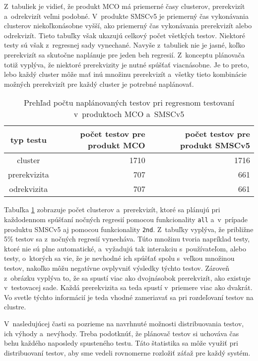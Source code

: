 Z~tabuliek je vidieť, že produkt MCO má priemerné časy clusterov, 
prerekvizít a~odrekvizít veľmi podobné. V~produkte SMSCv5 je priemerný 
čas vykonávania clusterov niekoľkonásobne vyšší, ako priemerný čas 
vykonávania prerekvizít alebo odrekvizít.
Tieto tabuľky však ukazujú celkový počet všetkých testov. 
Niektoré testy sú však z~regresnej sady vynechané.
Navyše z~tabuliek nie je jasné, koľko prerekvizít sa skutočne naplánuje 
pre jeden beh regresií. Z~konceptu plánovača totiž vyplýva, že niektoré 
prerekvizity je nutné spúšťať viacnásobne.
Je to preto, lebo každý cluster môže mať inú množinu prerekvizít
a~všetky tieto kombinácie možných prerekvizít pre každý cluster
je potrebné naplánovať.

\begin{table}
  \begin{center}
    \begin{tabular}{| c | r | r |}
    \hline
    typ testu    & počet testov pre produkt MCO & 
    počet testov pre produkt SMSCv5 \\ \hline
    cluster      & 1710 & 1716 \\ \hline
    prerekvizita & 707  & 661  \\ \hline
    odrekvizita  & 707  & 661 \\
    \hline
    \end{tabular}
    \caption{Prehľad počtu naplánovaných testov pri regresnom testovaní 
             v~produktoch MCO a~SMSCv5}
    \label{tabulka:pocet_naplanovanych_testov}
  \end{center}
\end{table}

Tabuľka \ref{tabulka:pocet_naplanovanych_testov} zobrazuje počet 
clusterov a~prerekvizít, ktoré sa plánujú pri každodennom spúšťaní 
nočných regresií pomocou funkcionality \texttt{all} a~v~prípade produktu 
SMSCv5 aj pomocou funkcionality \texttt{2nd}. Z~tabuľky vyplýva, že 
približne 5\% testov sa z~nočných regresií vynecháva. 
Túto množinu tvoria napríklad testy, ktoré nie sú plne automatické, 
a~vyžadujú tak interakciu s~používateľom, alebo testy, o~ktorých sa vie, 
že je nevhodné ich spúšťať spolu s~veľkou množinou testov, 
nakoľko môžu negatívne ovplyvniť výsledky týchto testov.
Zároveň z~obrázku vyplýva to, že sa spustí viac ako dvojnásobok 
prerekvizít, ako existuje v~testovacej sade. Každá prerekvizita sa teda 
spustí v~priemere viac ako dvakrát. Vo svetle týchto informácií je teda 
vhodné zameriavať sa pri rozdeľovaní testov na clustre.

V~nasledujúcej časti sa pozrieme na navrhnuté možnosti distribuovania 
testov, ich výhody a~nevýhody. Treba podotknúť, že plánovač testov si 
uchováva čas behu každého naposledy spusteného testu.
Táto štatistika sa môže využiť pri distribuovaní testov, aby sme vedeli 
rovnomerne rozložiť záťaž pre každý systém.
